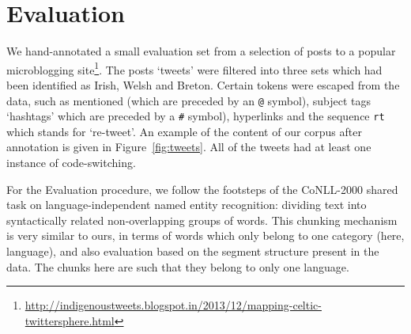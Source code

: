 \documentclass[11pt]{article}
\begin{document}

\section{Evaluation}
\label{sec:eval}

We hand-annotated a small evaluation set from a selection of posts to a popular microblogging site\footnote{\url{http://indigenoustweets.blogspot.in/2013/12/mapping-celtic-twittersphere.html}}. The posts `tweets' were filtered into three sets which had been identified as Irish, Welsh and Breton.  Certain tokens were escaped from the data, such as mentioned (which are preceded by an \texttt{@} symbol), subject tags `hashtags' which are preceded by a \texttt{\#} symbol), hyperlinks and the sequence \texttt{rt} which stands for `re-tweet'. An example of the content of our corpus after annotation is given in Figure~\ref{fig:tweets}. All of the tweets had at least one instance of code-switching.

For the Evaluation procedure, we follow the footsteps of the CoNLL-2000 shared task on language-independent 
named entity recognition: dividing text into syntactically related non-overlapping groups of words. This 
chunking mechanism \cite{tjong2003introduction} is very similar to ours, in terms of words which only belong to 
one category (here, language), and also evaluation based on the segment structure present in the data. The chunks 
here are such that they belong to only one language. 
\end{document}
